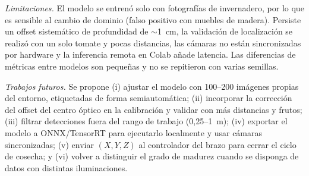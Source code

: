 \documentclass[conference]{IEEEtran}
\begin{document}
\emph{Limitaciones.} El modelo se entrenó solo con fotografías de invernadero, por lo que es sensible al cambio de dominio (falso positivo con muebles de madera). Persiste un offset sistemático de profundidad de $\sim$1~cm, la validación de localización se realizó con un solo tomate y pocas distancias, las cámaras no están sincronizadas por hardware y la inferencia remota en Colab añade latencia. Las diferencias de métricas entre modelos son pequeñas y no se repitieron con varias semillas.

\emph{Trabajos futuros.} Se propone (i) ajustar el modelo con 100--200 imágenes propias del entorno, etiquetadas de forma semiautomática; (ii) incorporar la corrección del offset del centro óptico en la calibración y validar con más distancias y frutos; (iii) filtrar detecciones fuera del rango de trabajo (0,25--1~m); (iv) exportar el modelo a ONNX/TensorRT para ejecutarlo localmente y usar cámaras sincronizadas; (v) enviar $(X,Y,Z)$ al controlador del brazo para cerrar el ciclo de cosecha; y (vi) volver a distinguir el grado de madurez cuando se disponga de datos con distintas iluminaciones.
\end{document}
